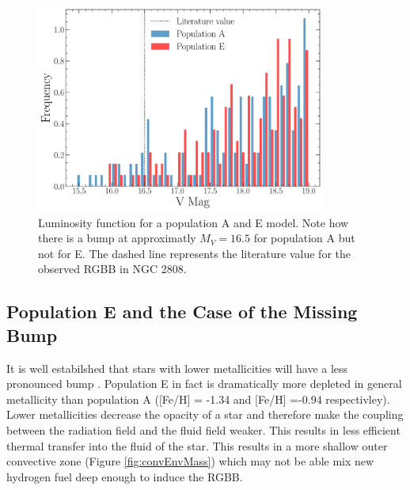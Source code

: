 \begin{figure}
  \centering
  \includegraphics[width=0.85\textwidth]{figures/rgbb/ComparisonOfRGBBump.pdf}
  \caption{Luminosity function for a population A and E model. Note how there
  is a bump at approximatly $M_{V} = 16.5$ for population A but not for E. The
  dashed line represents the literature value for the observed RGBB in NGC
  2808.}
  \label{fig:LumFAE}
\end{figure}

\subsection{Population E and the Case of the Missing Bump}
It is well estabilshed that stars with lower metallicities will have a less
pronounced bump \addcite. Population E in fact is dramatically more depleted in
general metallicity than population A ([Fe/H] = -1.34 and [Fe/H] =-0.94
respectivley). Lower metallicities decrease the opacity of a star and therefore
make the coupling between the radiation field and the fluid field weaker. This
results in less efficient thermal transfer into the fluid of the star. This
results in a more shallow outer convective zone (Figure \ref{fig:convEnvMass})
which may not be able mix new hydrogen fuel deep enough to induce the RGBB.

